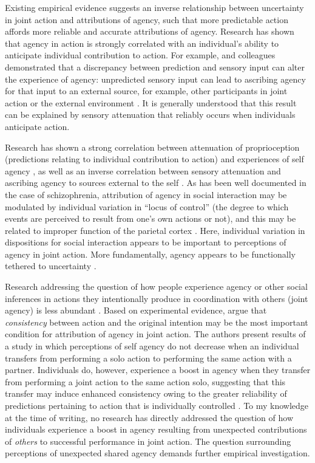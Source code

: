 \begin{CJK}{UTF8}{gbsn}
Existing empirical evidence suggests an inverse relationship between uncertainty in joint action and attributions of agency, such that more predictable action affords more reliable and accurate attributions of agency.  Research has shown that agency in action is strongly correlated with an individual's ability to anticipate individual contribution to action.  For example, \textcite{Sato2008} and colleagues demonstrated that a discrepancy between prediction and sensory input can alter the experience of agency: unpredicted sensory input can lead to ascribing agency for that input to an external source, for example, other participants in joint action or the external environment \citep{Sato2005,Frith2007}.  It is generally understood that this result can be explained by sensory attenuation that reliably occurs when individuals anticipate action.

Research has shown a strong correlation between attenuation of proprioception (predictions relating to individual contribution to action) and experiences of self agency \citep{Wolpert2003,Sato2008}, as well as an inverse correlation between sensory attenuation and ascribing agency to sources external to the self \citep{Brown2013}.  As has been well documented in the case of schizophrenia, attribution of agency in social interaction may be modulated by individual variation in ``locus of control'' (the degree to which events are perceived to result from one's own actions or not), and this may be related to improper function of the parietal cortex \citep{Frith2000}.  Here, individual variation in dispositions for social interaction appears to be important to perceptions of agency in joint action.  More fundamentally, agency appears to be functionally tethered to uncertainty \citep{Frith2007}.

Research addressing the question of how people experience agency or other social inferences in actions they intentionally produce in coordination with others (joint agency) is less abundant \citep[but see][]{VanderWel2012,VanderWel2013}. Based on experimental evidence, \textcite{VanderWel2012} argue that \textit{consistency} between action and the original intention may be the most important condition for attribution of agency in joint action.  The authors present results of a study in which perceptions of self agency do not decrease when an individual transfers from performing a solo action to performing the same action with a partner.  Individuals do, however, experience a boost in agency when they transfer from performing a joint action to the same action solo, suggesting that this transfer may induce enhanced consistency owing to the greater reliability of predictions pertaining to action that is individually controlled \citep{VanderWel2012}.  To my knowledge at the time of writing, no research has directly addressed the question of how individuals experience a boost in agency resulting from unexpected contributions of \textit{others} to successful performance in joint action.  The question surrounding perceptions of unexpected shared agency demands further empirical investigation.


\end{CJK}
